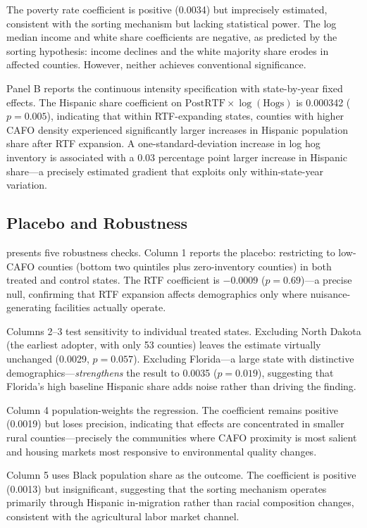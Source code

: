 \documentclass[12pt]{article}
\begin{document}
The poverty rate coefficient is positive (0.0034) but imprecisely estimated, consistent with the sorting mechanism but lacking statistical power. The log median income and white share coefficients are negative, as predicted by the sorting hypothesis: income declines and the white majority share erodes in affected counties. However, neither achieves conventional significance.

Panel B reports the continuous intensity specification with state-by-year fixed effects. The Hispanic share coefficient on $\text{PostRTF} \times \log(\text{Hogs})$ is 0.000342 ($p = 0.005$), indicating that within RTF-expanding states, counties with higher CAFO density experienced significantly larger increases in Hispanic population share after RTF expansion. A one-standard-deviation increase in log hog inventory is associated with a 0.03 percentage point larger increase in Hispanic share---a precisely estimated gradient that exploits only within-state-year variation.

\subsection{Placebo and Robustness}



 presents five robustness checks. Column 1 reports the placebo: restricting to low-CAFO counties (bottom two quintiles plus zero-inventory counties) in both treated and control states. The RTF coefficient is $-0.0009$ ($p = 0.69$)---a precise null, confirming that RTF expansion affects demographics only where nuisance-generating facilities actually operate.

Columns 2--3 test sensitivity to individual treated states. Excluding North Dakota (the earliest adopter, with only 53 counties) leaves the estimate virtually unchanged (0.0029, $p = 0.057$). Excluding Florida---a large state with distinctive demographics---\textit{strengthens} the result to 0.0035 ($p = 0.019$), suggesting that Florida's high baseline Hispanic share adds noise rather than driving the finding.

Column 4 population-weights the regression. The coefficient remains positive (0.0019) but loses precision, indicating that effects are concentrated in smaller rural counties---precisely the communities where CAFO proximity is most salient and housing markets most responsive to environmental quality changes.

Column 5 uses Black population share as the outcome. The coefficient is positive (0.0013) but insignificant, suggesting that the sorting mechanism operates primarily through Hispanic in-migration rather than racial composition changes, consistent with the agricultural labor market channel.
\end{document}
